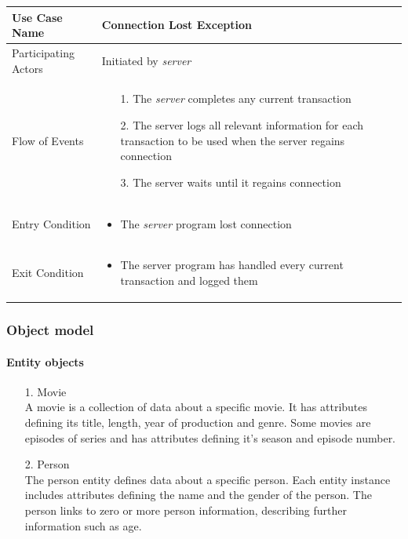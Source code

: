 \begin{center}
	\begin{tabular}{ | l | p{10cm} |  }
		 \hline
		Use Case Name & Connection Lost Exception \\ \hline
		Participating Actors & Initiated by \emph{server} \\ \hline
		Flow of Events & \begin{enumerate}
						\item[1.] The \emph{server} completes any current transaction
						\item[2.] The server logs all relevant information for each transaction to be used when the server regains connection
						\item[3.] The server waits until it regains connection
						\end{enumerate} \\ \hline
		Entry Condition & \begin{itemize}
						\item The \emph{server} program lost connection
					\end{itemize} \\ \hline
		Exit Condition & \begin{itemize}
						\item The server program has handled every current transaction and logged them
					\end{itemize} \\
		\hline
	\end{tabular}
\end{center}

\subsubsection{Object model}

\paragraph{Entity objects}

\begin{enumerate}
	\item[1.] Movie \hfill \\
	A movie is a collection of data about a specific movie. It has attributes defining its title, length, year of production and genre. Some movies are episodes of series and has attributes defining it's season and episode number.
	
	\item[2.] Person \hfill \\
	The person entity defines data about a specific person. Each entity instance includes attributes defining the name and the gender of the person. The person links to zero or more person information, describing further information such as age.
	
\end{enumerate}

